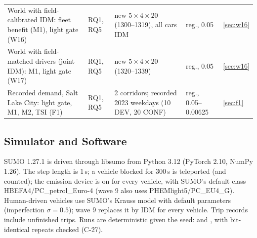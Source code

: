 \begin{table}[t]
\begin{tabular}{@{}p{5.3cm}p{1.5cm}p{6.0cm}p{2.5cm}l@{}}
World with field-calibrated IDM: fleet benefit (M1), light gate (W16) & RQ1, RQ5 & new $5\times4\times20$ (1300--1319), all cars IDM & reg., 0.05 & \ref{sec:w16}\\
World with field-matched drivers (joint IDM): M1, light gate (W17) & RQ1, RQ5 & new $5\times4\times20$ (1320--1339) & reg., 0.05 & \ref{sec:w16}\\
Recorded demand, Salt Lake City: light gate, M1, M2, TSI (F1) & RQ1, RQ5 & 2 corridors; recorded 2023 weekdays (10 DEV, 20 CONF) & reg., 0.05--0.00625 & \ref{sec:f1}\\\bottomrule
\end{tabular}\end{table}

\subsection{Simulator and Software}
SUMO 1.27.1 \cite{lopez2018} is driven through libsumo from Python 3.12 (PyTorch 2.10, NumPy 1.26). The step length is 1\,s; a vehicle
blocked for 300\,s is teleported (and counted); the emission device is on for every vehicle, with SUMO's default class
HBEFA4/PC\_petrol\_Euro-4 \cite{krajzewicz2015} (wave 9 also uses PHEMlight5/PC\_EU4\_G). Human-driven vehicles use SUMO's Krauss model
\cite{krauss1998} with default parameters (imperfection $\sigma=0.5$); wave 9 replaces it by IDM \cite{treiber2000} for every vehicle.
Trip records include unfinished trips. Runs are deterministic given the seed:  and , with
bit-identical repeats checked (C-27).

